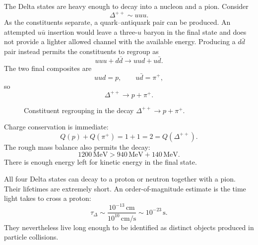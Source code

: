 The Delta states are heavy enough to decay into a nucleon and a pion. Consider
\begin{equation}
\Delta^{++}\sim uuu.
\end{equation}
As the constituents separate, a quark--antiquark pair can be produced. An attempted \(u\bar u\) insertion would leave a three-\(u\) baryon in the final state and does not provide a lighter allowed channel with the available energy. Producing a \(d\bar d\) pair instead permits the constituents to regroup as
\begin{equation}
uuu+d\bar d
\longrightarrow
uud+u\bar d.
\end{equation}
The two final composites are
\begin{equation}
uud=p,
\qquad
u\bar d=\pi^+,
\end{equation}
so
\begin{equation}
\Delta^{++}\longrightarrow p+\pi^+.
\end{equation}

\begin{figure}[h]
\centering
{}
\caption{Constituent regrouping in the decay \(\Delta^{++}\rightarrow p+\pi^+\).}
\end{figure}

Charge conservation is immediate:
\begin{equation}
Q(p)+Q(\pi^+)=1+1=2=Q(\Delta^{++}).
\end{equation}
The rough mass balance also permits the decay:
\begin{equation}
1200\,\mathrm{MeV}
>
940\,\mathrm{MeV}+140\,\mathrm{MeV}.
\end{equation}
There is enough energy left for kinetic energy in the final state.

All four Delta states can decay to a proton or neutron together with a pion. Their lifetimes are extremely short. An order-of-magnitude estimate is the time light takes to cross a proton:
\begin{equation}
\tau_\Delta
\sim
\frac{10^{-13}\,\mathrm{cm}}
     {10^{10}\,\mathrm{cm/s}}
\sim10^{-23}\,\mathrm{s}.
\end{equation}
They nevertheless live long enough to be identified as distinct objects produced in particle collisions.


